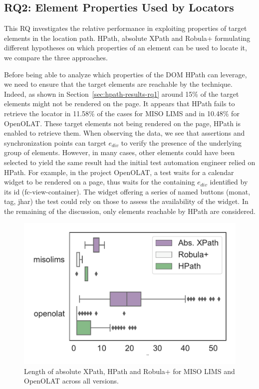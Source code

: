 \subsection{RQ2: Element Properties Used by Locators}
\label{sec:hpath-results-rq2}

This RQ investigates the relative performance in exploiting properties of target elements in the location path. HPath, absolute XPath and Robula+ formulating different hypotheses on which properties of an element can be used to locate it, we compare the three approaches.

Before being able to analyze which properties of the DOM HPath can leverage, we need to ensure that the target elements are reachable by the technique. Indeed, as shown in Section~\ref{sec:hpath-results-rq1} around 15\% of the target elements might not be rendered on the page. It appears that HPath fails to retrieve the locator in 11.58\% of the cases for MISO LIMS and in 10.48\% for OpenOLAT. These target elements not being rendered on the page, HPath is enabled to retrieve them. When observing the data, we see that assertions and synchronization points can target $e_{div}$ to verify the presence of the underlying group of elements. However, in many cases, other elements could have been selected to yield the same result had the initial test automation engineer relied on HPath. For example, in the project OpenOLAT, a test waits for a calendar widget to be rendered on a page, thus waits for the containing $e_{div}$ identified by its id (fc-view-container). The widget offering a series of named buttons (monat, tag, jhar) the test could rely on those to assess the availability of the widget. In the remaining of the discussion, only elements reachable by HPath are considered.

\begin{figure}
\centering
\includegraphics[width=0.6\columnwidth]{figures/hpath/canonical-selector-complexity-dist.pdf}
\caption{Length of absolute XPath, HPath and Robula+ for MISO LIMS and OpenOLAT across all versions.}  
\label{fig:hpath-results-lengths}
\end{figure}

